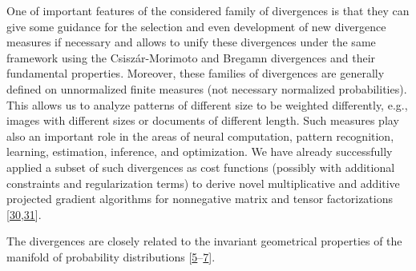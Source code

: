One of important features of the considered family of divergences is that they can give some guidance for the selection and even development of new divergence measures if necessary and allows to unify these divergences under the same framework using the Csiszár-Morimoto and Bregamn divergences and their fundamental properties. Moreover, these families of divergences are generally defined on unnormalized finite measures (not necessary normalized probabilities). This allows us to analyze patterns of different size to be weighted differently, e.g., images with different sizes or documents of different length. Such measures play also an important role in the areas of neural computation, pattern recognition, learning, estimation, inference, and optimization. We have already successfully applied a subset of such divergences as cost functions (possibly with additional constraints and regularization terms) to derive novel multiplicative and additive projected gradient algorithms for nonnegative matrix and tensor factorizations [\hyperlink{B30-entropy-12-01532}{30},\allowbreak \hyperlink{B31-entropy-12-01532}{31}].


The divergences are closely related to the invariant geometrical properties of the manifold of probability distributions [\hyperlink{B5-entropy-12-01532}{5}--\hyperlink{B7-entropy-12-01532}{7}].
